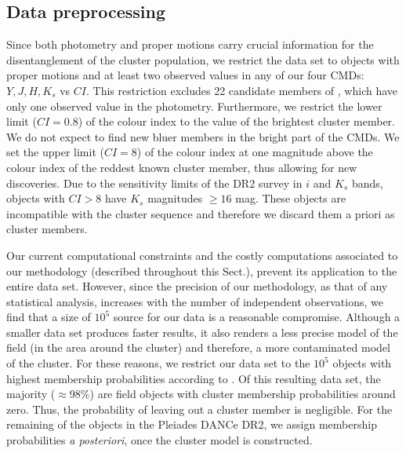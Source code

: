 \subsection{Data preprocessing}
 Since both photometry and proper motions carry crucial information for the disentanglement of the cluster population, we restrict the data set to objects with proper motions and at least two observed values in any of our four CMDs: $Y,J,H,K_s$ vs $CI$. This restriction excludes 22 candidate members of \citet{Bouy2015}, which have only one observed value in the photometry. Furthermore, we restrict the lower limit ($CI =0.8$) of the colour index to the value of the brightest cluster member. We do not expect to find new bluer members in the bright part of the CMDs. We set the upper limit ($CI=8$) of the colour index at one magnitude above the colour index of the reddest known cluster member, thus allowing for new discoveries. Due to the sensitivity limits of the DR2 survey in $i$ and $K_s$ bands, objects with $CI>8$ have $K_s$ magnitudes $\geq 16$ mag. These objects are incompatible with the cluster sequence and therefore we discard them a priori as cluster members.

Our current computational constraints and the costly computations associated to our methodology (described throughout this Sect.), prevent its application to the entire data set. However, since the precision of our methodology, as that of any statistical analysis, increases with the number of independent observations, we find that a size of $10^5$ source for our data is a reasonable compromise. Although a smaller data set produces faster results, it also renders a less precise model of the field (in the area around the cluster) and therefore, a more contaminated model of the cluster. For these reasons, we restrict our data set to the $10^5$ objects with highest membership probabilities according to \citet{Bouy2015}. Of this resulting data set, the majority ($\approx$98\%) are field objects with cluster membership probabilities around zero. Thus, the probability of leaving out a cluster member is negligible. For the remaining of the objects in the Pleiades DANCe DR2, we assign membership probabilities \emph{a posteriori}, once the cluster model is constructed.



